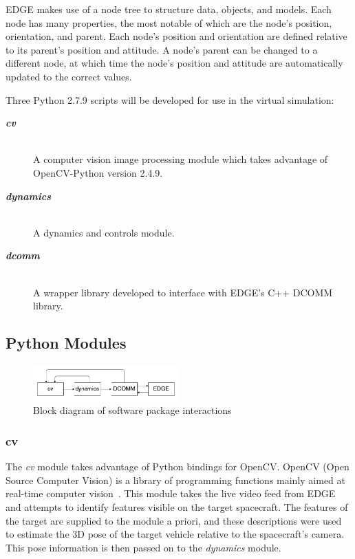 \documentclass[journal, 10pt]{IEEEtran}
\begin{document}
EDGE makes use of a node tree to structure data, objects, and models. Each node has many properties, the most notable of which are the node's position, orientation, and parent. Each node's position and orientation are defined relative to its parent's position and attitude. A node's parent can be changed to a different node, at which time the node's position and attitude are automatically updated to the correct values.

Three Python 2.7.9 scripts will be developed for use in the virtual simulation:
\begin{description}
    \item[\textbf{\textit{cv}}] \hfill \\
    A computer vision image processing module which takes advantage of OpenCV-Python version 2.4.9.
    \item[\textbf{\textit{dynamics}}] \hfill \\
    A dynamics and controls module.
    \item[\textbf{\textit{dcomm}}] \hfill \\
    A wrapper library developed to interface with EDGE's C++ DCOMM library.
\end{description}

\subsection{Python Modules}
\begin{figure}[b]
\begin{center}
\includegraphics[width=0.5\textwidth]{figures/block.pdf}
\caption{Block diagram of software package interactions}
\label{block_diagram}
\end{center}
\end{figure}

\subsubsection{cv}
The \textit{cv} module takes advantage of Python bindings for OpenCV. OpenCV (Open Source Computer Vision) is a library of programming functions mainly aimed at real-time computer vision~\cite{opencv}. This module takes the live video feed from EDGE and attempts to identify features visible on the target spacecraft. The features of the target are supplied to the module a priori, and these descriptions were used to estimate the 3D pose of the target vehicle relative to the spacecraft's camera. This pose information is then passed on to the \textit{dynamics} module.
\end{document}
